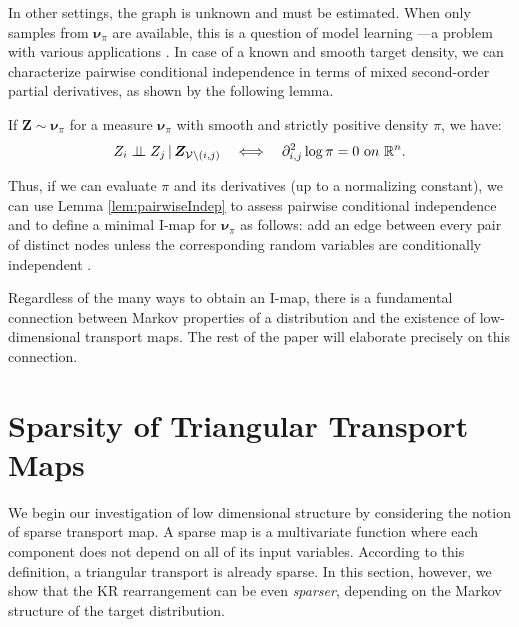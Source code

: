 \documentclass[twoside,11pt]{article}
\newcommand{\orth}{ \perp\!\!\!\perp }  %
\newcommand{\genm}{\boldsymbol{\nu} }   %
\newcommand{\re}{\mathbb{R}}
\newcommand{\Vc}{\mathcal{V}}
\newcommand{\Zb}{\boldsymbol{Z}}
\begin{document}
In other settings, the graph is unknown and must be estimated. When only samples from 
$\genm_\pi$ are available, this is a question of model learning
%
\citep[Part III]{koller2009probabilistic}---a problem with
various applications
%
%
%
\citep{hyvarinen2005estimation,meinshausen2006high,lin2015high}.
%
%
%
%
%
%
In case of a known and smooth target density, we can 
characterize pairwise conditional independence in terms of mixed
second-order partial derivatives, as shown by the following lemma. 
%
%
%
%
\begin{lemma} \label{lem:pairwiseIndep}
If $\Zb \sim \genm_\pi$  for a measure $\genm_\pi$ with smooth and strictly positive
density $\pi$, we have:
%
%
\begin{equation}
Z_i \orth Z_j \,\vert\, \Zb_{\Vc\setminus (i,j)} \quad
\Longleftrightarrow \quad
\partial^2_{i,j}\log \pi = 0 %
%
 \,\, {\text on} \,\, \re^n.
\end{equation}
\end{lemma}
Thus, if we can evaluate $\pi$ and its derivatives (up to
a normalizing constant), we can
use Lemma \ref{lem:pairwiseIndep} to assess pairwise
conditional independence and to define a minimal I-map for $\genm_\pi$
as follows: add an edge between every pair
of distinct nodes unless the corresponding random variables
are conditionally independent  
\citep[Thm.~4.5]{koller2009probabilistic}.
%
%
%
%
%

Regardless of the many ways to obtain an I-map, 
there is a fundamental connection between Markov properties of
a distribution and the existence
of low-dimensional transport maps.
%
%
%
The rest of the paper will elaborate precisely on this connection.
%
%
%
%
%
%
%
%
%
%
%
%
%
%



%
%
%
%



%
%
%
%
%
%
%
%
%
%
%
%
%
%
%
%
%
%

\section{Sparsity of Triangular Transport Maps}
\label{sec:sparse}
%
%
We begin our investigation of low dimensional structure 
%
%
by considering
the notion of sparse transport map.
%
A sparse  map    
%
%
is a multivariate function where each component does not
depend on all of its input variables. According to this definition, a
triangular 
transport 
%
is already sparse.  In this section, however, we
show that the KR rearrangement can be even 
%
%
%
\textit{sparser}, depending on the Markov structure of the target
distribution.
\end{document}
